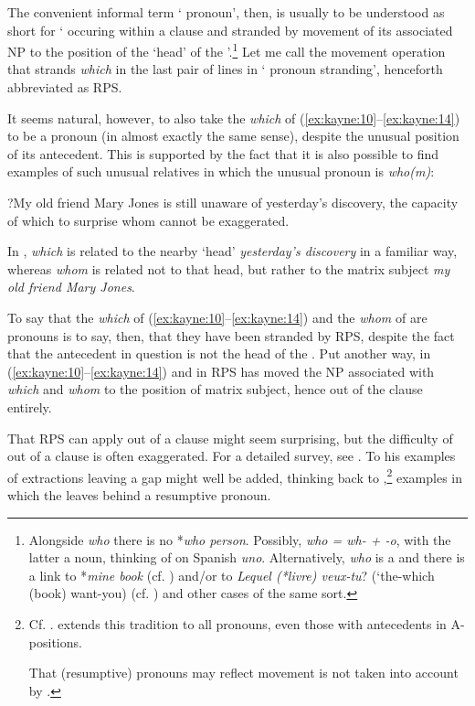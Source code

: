 \documentclass[output=paper]{LSP/langsci}
\begin{document}
     The convenient informal term ‘ pronoun’, then, is usually to be understood as short for ‘ occuring within a  clause and stranded by movement of its associated NP to the position of the ‘head’ of the ’.\footnote{Alongside  \textit{who} there is no *\textit{who person}.  Possibly, \textit{who = wh- + -o}, with the latter a noun, thinking of \citet{Bernstein1993} on Spanish \textit{uno}.  Alternatively, \textit{who} is a  and there is a link to *\textit{mine book} (cf. \citet{BernsteinTortora2005}) and/or to  \textit{Lequel (*livre) veux-tu}? (‘the-which (book) want-you) (cf. \citealt{Kayne2008b}) and other cases of the same sort.}   Let me call the movement operation that strands \textit{which} in the last pair of lines in  ‘ pronoun stranding’, henceforth abbreviated as RPS.

     It seems natural, however, to also take the \textit{which} of (\ref{ex:kayne:10}--\ref{ex:kayne:14}) to be a  pronoun (in almost exactly the same sense), despite the unusual position of its antecedent.  This is supported by the fact that it is also possible to find examples of such unusual relatives in which the unusual  pronoun is \textit{who(m)}:

\ea\label{ex:kayne:17}
   ?My old friend Mary Jones is still unaware of yesterday’s discovery, the capacity of which to surprise whom cannot be exaggerated.
\z

In , \textit{which} is related to the nearby ‘head’ \textit{yesterday’s discovery} in a familiar way, whereas \textit{whom} is related not to that head, but rather to the matrix subject \textit{my old friend Mary Jones}.

      To say that the \textit{which} of (\ref{ex:kayne:10}--\ref{ex:kayne:14}) and the \textit{whom} of  are  pronouns is to say, then, that they have been stranded by RPS, despite the fact that the antecedent in {question} is not the head of the .  Put another way, in (\ref{ex:kayne:10}--\ref{ex:kayne:14}) and in  RPS has moved the NP associated with \textit{which} and \textit{whom} to the position of matrix subject, hence out of the  clause entirely.

     That RPS can apply out of a  clause might seem surprising, but the difficulty of  out of a  clause is often exaggerated.  For a detailed survey, see \citet{Cinque2010complexnp}.  To his examples of extractions leaving a gap might well be added, thinking back to \citet{Ross1967},\footnote{Cf. \citet{Boeckx2001,Boeckx2003}{}.  \citet{Kayne2002} extends this tradition to all pronouns, even those with antecedents in A-positions.

     That (resumptive) pronouns may reflect movement is not taken into account by \citet{Bošković2015}.} examples in which the  leaves behind a resumptive pronoun.
\end{document}
